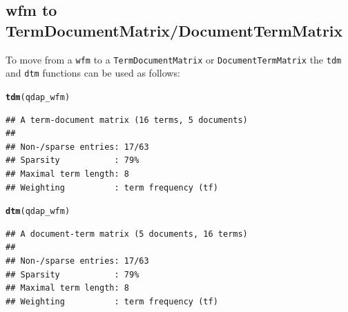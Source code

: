 \documentclass{article}\usepackage[]{graphicx}\usepackage[]{color}
\makeatletter
\newcommand{\hlstd}[1]{\textcolor[rgb]{0.345,0.345,0.345}{#1}}%
\newcommand{\hlkwd}[1]{\textcolor[rgb]{0.737,0.353,0.396}{\textbf{#1}}}%
\newenvironment{kframe}{%
 \def\at@end@of@kframe{}%
 \ifinner\ifhmode%
  \def\at@end@of@kframe{\end{minipage}}%
  \begin{minipage}{\columnwidth}%
 \fi\fi%
 \def\FrameCommand##1{\hskip\@totalleftmargin \hskip-\fboxsep
 \colorbox{shadecolor}{##1}\hskip-\fboxsep
     \hskip-\linewidth \hskip-\@totalleftmargin \hskip\columnwidth}%
 \MakeFramed {\advance\hsize-\width
   \@totalleftmargin\z@ \linewidth\hsize
   \@setminipage}}%
 {\par\unskip\endMakeFramed%
 \at@end@of@kframe}
\newenvironment{knitrout}{}{} %
\makeatother
\begin{document}
\subsection{wfm to TermDocumentMatrix/DocumentTermMatrix}

To move from a \texttt{wfm} to a \texttt{TermDocumentMatrix} or \texttt{DocumentTermMatrix} the \texttt{tdm} and \texttt{dtm} functions can be used as follows:

\begin{knitrout}
\color{fgcolor}\begin{kframe}
\begin{alltt}
\hlkwd{tdm}\hlstd{(qdap_wfm)}
\end{alltt}
\begin{verbatim}
## A term-document matrix (16 terms, 5 documents)
## 
## Non-/sparse entries: 17/63
## Sparsity           : 79%
## Maximal term length: 8 
## Weighting          : term frequency (tf)
\end{verbatim}
\begin{alltt}
\hlkwd{dtm}\hlstd{(qdap_wfm)}
\end{alltt}
\begin{verbatim}
## A document-term matrix (5 documents, 16 terms)
## 
## Non-/sparse entries: 17/63
## Sparsity           : 79%
## Maximal term length: 8 
## Weighting          : term frequency (tf)
\end{verbatim}
\end{kframe}
\end{knitrout}






\end{document}
